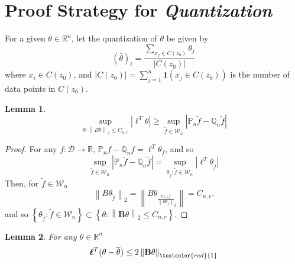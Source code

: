 \documentclass{article}
\newcommand{\Reals}{\mathbb{R}}
\newcommand{\norm}[1]{\left\lVert#1\right\rVert}
\newcommand{\abs}[1]{\left \lvert #1 \right \rvert}
\newcommand{\set}[1]{\left\{#1\right\}}
\newcommand{\Bbf}{\mathbf{B}}
\newcommand{\lbf}{\bm{\ell}}
\newcommand{\Dset}{\mathcal{D}}
\newcommand{\Wset}{\mathcal{W}}
\newcommand{\Pbb}{\mathbb{P}}
\newcommand{\Qbb}{\mathbb{Q}}
\newcommand{\1}{\mathbf{1}}
\theoremstyle{alden}
\theoremstyle{aldenthm}
\newtheorem{lemma}{Lemma}
\theoremstyle{remark}
\begin{document}
\section{Proof Strategy for \emph{Quantization}}

For a given $\theta \in \Reals^n$, let the quantization of $\theta$ be given by
\begin{equation*}
(\bar{\theta})_i = \frac{\sum_{x_j \in C(z_0)} \theta_j}{\abs{C(z_0)}}
\end{equation*}
where $x_i \in C(z_0)$, and $\abs{C(z_0)} = \sum_{j = 1}^{n} \1(x_j \in C(z_0))$ is the number of data points in $C(z_0)$.

\begin{lemma}
	\begin{equation*}
	\sup_{\theta: \norm{B\theta}_2 \leq C_{n,r}} \abs{\lbf^T \theta} \geq \sup_{\widetilde{f} \in \Wset_n} \abs{\Pbb_n \widetilde{f} - \Qbb_n \widetilde{f}}
	\end{equation*}
\end{lemma}
\begin{proof}
	For any $f: \Dset \to \Reals$, $\mathbb{P}_n f - \mathbb{Q}_n f = \lbf^T \theta_f$, and so
	\begin{equation*}
	\sup_{\widetilde{f} \in \Wset_n} \abs{\Pbb_n \widetilde{f} - \Qbb_n \widetilde{f}} = \sup_{\theta_{\widetilde{f}}: \widetilde{f} \in \Wset_n} \abs{\lbf^T \theta_{\widetilde{f}}}
	\end{equation*}
	Then, for $\widetilde{f} \in \Wset_n$
	\begin{equation*}
	\norm{B \theta_{\widetilde{f}}}_2 = \norm{B \theta_{\frac{C_{n,r}\overline{f}} {\norm{B \theta_{\overline{f}}}}_2}} = C_{n,r}.
	\end{equation*}
	and so $\set{\theta_{\widetilde{f}}: \widetilde{f} \in \Wset_n} \subset \set{\theta: \norm{\Bbf \theta}_2 \leq C_{n,r}}$.
\end{proof}

\begin{lemma}
	For any $\theta \in \Reals^n$
	\begin{equation*}
	\lbf^T(\theta - \overline{\theta}) \leq 2 \norm{\Bbf \theta}_{\textcolor{red}{1}}
	\end{equation*}
\end{lemma}
\end{document}
